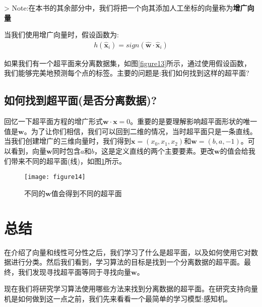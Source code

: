 > Note:在本书的其余部分中，我们将把一个向其添加人工坐标的向量称为\textbf{增广向量}

当我们使用增广向量时，假设函数为:
\begin{gather*}
h(\mathbf{\hat{x}}_i) = sign(\mathbf{\hat{w}}\cdot\mathbf{\hat{x}}_i)
\end{gather*}

如果我们有一个超平面来分离数据集，如图\ref{figure13}所示，通过使用假设函数，我们能够完美地预测每个点的标签。主要的问题是:我们如何找到这样的超平面?

\subsection{如何找到超平面(是否分离数据)?}

回忆一下超平面方程的增广形式$\mathbf{w}\cdot\mathbf{x}=0$。重要的是要理解影响超平面形状的唯一值是$\mathbf{w}$。为了让你们相信，我们可以回到二维的情况，当时超平面只是一条直线。当我们创建增广的三维向量时，我们得到$\mathbf{x}=(x_0,x_1,x_2)$和$\mathbf{w}=(b,a,-1)$。可以看到，向量$\mathbf{w}$同时包含$a$和$b$，这是定义直线的两个主要要素。更改$\mathbf{w}$的值会给我们带来不同的超平面(线)，如图\ref{figure14}所示。


\begin{figure}[ht]
    \centering
    \texttt{[image: figure14]}
    \caption{不同的$\mathbf{w}$值会得到不同的超平面}
    \label{figure14}
\end{figure}

\section{总结}

在介绍了向量和线性可分性之后，我们学习了什么是超平面，以及如何使用它对数据进行分类。然后我们看到，学习算法的目标是找到一个分离数据的超平面。最终，我们发现寻找超平面等同于寻找向量$\mathbf{w}$。

现在我们将研究学习算法使用哪些方法来找到分离数据的超平面。在研究支持向量机是如何做到这一点之前，我们先来看看一个最简单的学习模型:感知机。